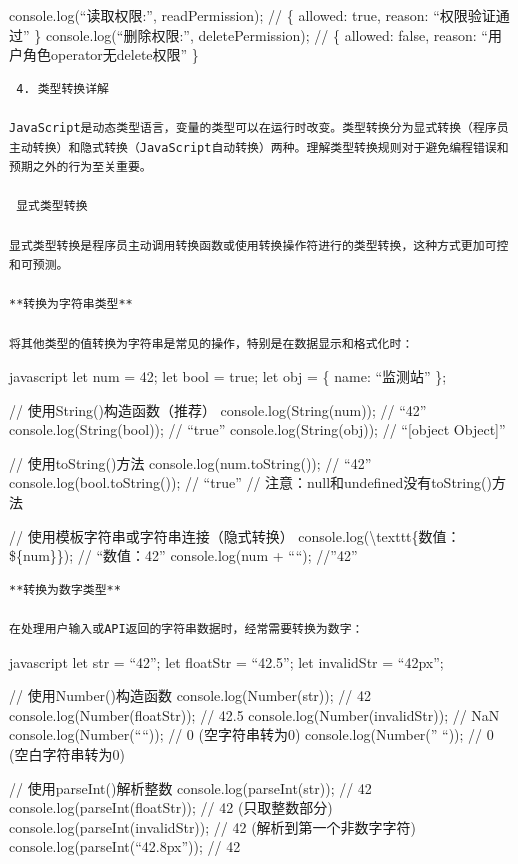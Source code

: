 console.log(``读取权限:'', readPermission); // \{ allowed: true, reason: ``权限验证通过'' \} console.log(``删除权限:'', deletePermission); // \{ allowed: false, reason: ``用户角色operator无delete权限'' \}

\begin{lstlisting}
 4. 类型转换详解

JavaScript是动态类型语言，变量的类型可以在运行时改变。类型转换分为显式转换（程序员主动转换）和隐式转换（JavaScript自动转换）两种。理解类型转换规则对于避免编程错误和预期之外的行为至关重要。

 显式类型转换

显式类型转换是程序员主动调用转换函数或使用转换操作符进行的类型转换，这种方式更加可控和可预测。

**转换为字符串类型**

将其他类型的值转换为字符串是常见的操作，特别是在数据显示和格式化时：
\end{lstlisting}

javascript let num = 42; let bool = true; let obj = \{ name: ``监测站'' \};

// 使用String()构造函数（推荐） console.log(String(num)); // ``42'' console.log(String(bool)); // ``true'' console.log(String(obj)); // ``{[}object Object{]}''

// 使用toString()方法 console.log(num.toString()); // ``42'' console.log(bool.toString()); // ``true'' // 注意：null和undefined没有toString()方法

// 使用模板字符串或字符串连接（隐式转换） console.log(\textbackslash texttt\{数值：\$\{num\}\}); // ``数值：42'' console.log(num + ````); //''42''

\begin{lstlisting}
**转换为数字类型**

在处理用户输入或API返回的字符串数据时，经常需要转换为数字：
\end{lstlisting}

javascript let str = ``42''; let floatStr = ``42.5''; let invalidStr = ``42px'';

// 使用Number()构造函数 console.log(Number(str)); // 42 console.log(Number(floatStr)); // 42.5 console.log(Number(invalidStr)); // NaN console.log(Number(````)); // 0 (空字符串转为0) console.log(Number('' ``)); // 0 (空白字符串转为0)

// 使用parseInt()解析整数 console.log(parseInt(str)); // 42 console.log(parseInt(floatStr)); // 42 (只取整数部分) console.log(parseInt(invalidStr)); // 42 (解析到第一个非数字字符) console.log(parseInt(``42.8px'')); // 42


